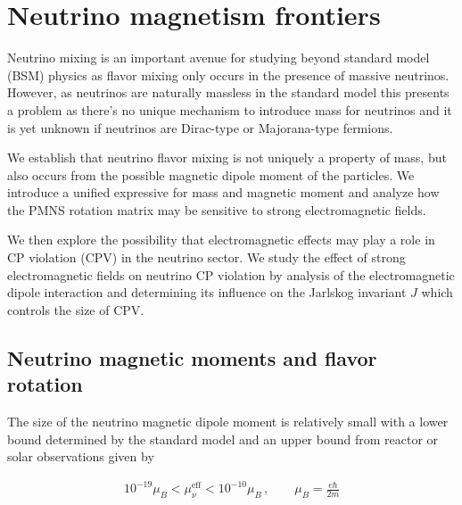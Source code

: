 \chapter{Neutrino magnetism frontiers}
\label{chap:neutrino}
\noindent Neutrino mixing is an important avenue for studying beyond standard model (BSM) physics as flavor mixing only occurs in the presence of massive neutrinos. However, as neutrinos are naturally massless in the standard model this presents a problem as there's no unique mechanism to introduce mass for neutrinos and it is yet unknown if neutrinos are Dirac-type or Majorana-type fermions.

We establish that neutrino flavor mixing is not uniquely a property of mass, but also occurs from the possible magnetic dipole moment of the particles. We introduce a unified expressive for mass and magnetic moment and analyze how the PMNS rotation matrix may be sensitive to strong electromagnetic fields.

We then explore the possibility that electromagnetic effects may play a role in CP violation (CPV) in the neutrino sector. We study the effect of strong electromagnetic fields on neutrino CP violation by analysis of the electromagnetic dipole interaction and determining its influence on the Jarlskog invariant $J$ which controls the size of CPV.


\section{Neutrino magnetic moments and flavor rotation}
\label{sec:flavor}
\noindent The size of the neutrino magnetic dipole moment is relatively small with a lower bound determined by the standard model and an upper bound from reactor or solar observations given by~\citep{alexander2016status,canas2016updating,sierra2022neutrino}

\begin{align}
    \label{momentbound:1}
    10^{-19}\mu_{B}<\mu_{\nu}^\mathrm{eff}<10^{-10}\mu_{B}\,,\qquad\mu_{B}=\frac{e\hbar}{2m}
\end{align}

